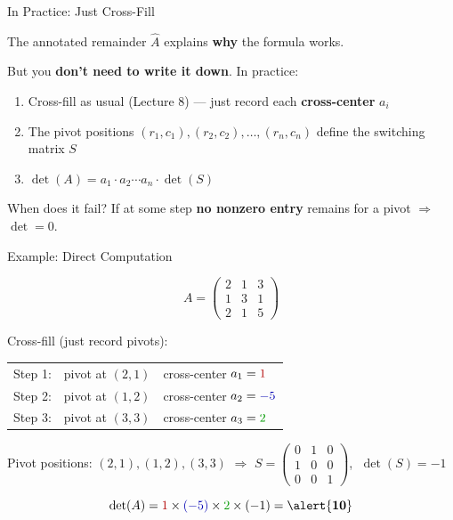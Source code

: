 \documentclass[10pt]{beamer}
\theoremstyle{definition}
\newcommand{\x}[1]{\alert{\textbf{#1}}}
\newcommand{\rd}[1]{{\color{red!70!black}#1}}
\newcommand{\bl}[1]{{\color{blue!70!black}#1}}
\newcommand{\gn}[1]{{\color{green!60!black}#1}}
\begin{document}
\begin{frame}{In Practice: Just Cross-Fill}

The annotated remainder $\widehat{A}$ explains \x{why} the formula works.

But you \x{don't need to write it down}. In practice:

\vfill

\begin{enumerate}
\item Cross-fill as usual (Lecture 8) --- just record each \x{cross-center} $a_i$
\item The pivot positions $(r_1,c_1), (r_2,c_2), \ldots, (r_n,c_n)$ define the switching matrix $S$
\item $\det(A) = a_1 \cdot a_2 \cdots a_n \cdot \det(S)$
\end{enumerate}

\vfill

\begin{alertblock}{When does it fail?}
If at some step \x{no nonzero entry} remains for a pivot $\Rightarrow$ $\det = 0$.
\end{alertblock}

\end{frame}


\begin{frame}{Example: Direct Computation}

$$
A = \begin{pmatrix} 2 & 1 & 3 \\ 1 & 3 & 1 \\ 2 & 1 & 5 \end{pmatrix}
$$

\vfill

Cross-fill (just record pivots):

\vfill

{\renewcommand{\arraystretch}{1.3}
\begin{tabular}{rll}
Step 1: & pivot at $(2,1)$ & cross-center $a_1 = \rd{1}$ \\
Step 2: & pivot at $(1,2)$ & cross-center $a_2 = \bl{-5}$ \\
Step 3: & pivot at $(3,3)$ & cross-center $a_3 = \gn{2}$
\end{tabular}
}

\vfill

Pivot positions: $(2,1), (1,2), (3,3)$ $\Rightarrow$ $S = \left(\begin{smallmatrix} 0 & 1 & 0 \\ 1 & 0 & 0 \\ 0 & 0 & 1 \end{smallmatrix}\right)$, $\;\det(S) = -1$

\vfill

$$
\det(A) = \rd{1} \times \bl{(-5)} \times \gn{2} \times (-1) = \x{10}
$$

\end{frame}
\end{document}
